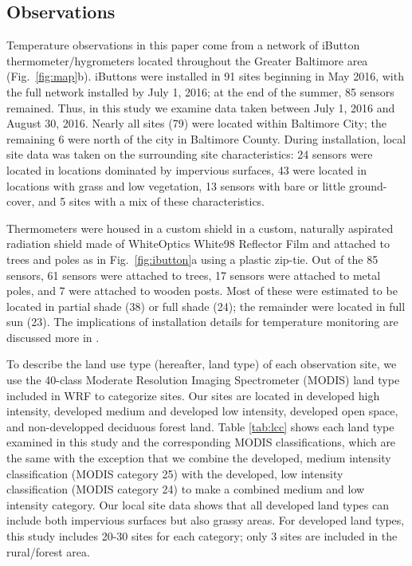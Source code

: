 \documentclass[draft,linenumbers]{agujournal}
\begin{document}
\subsection{Observations}
Temperature observations in this paper come from a network of iButton thermometer/hygrometers located throughout the Greater Baltimore area (Fig.~\ref{fig:map}b). 
iButtons were installed in 91 sites beginning in May 2016, with the full network installed by July 1, 2016; at the end of the summer, 85 sensors remained. Thus, in this study we examine data taken between July 1, 2016 and August 30, 2016. Nearly all sites (79) were located within Baltimore City; the remaining 6 were north of the city in Baltimore County. During installation, local site data was taken on the surrounding site characteristics: 24 sensors were located in locations dominated by impervious surfaces, 43 were located in locations with grass and low vegetation, 13 sensors with bare or little ground-cover, and 5 sites with a mix of these characteristics. 

Thermometers were housed in a custom shield in a custom, naturally aspirated radiation shield made of WhiteOptics White98 Reflector Film and attached to trees and poles as in Fig.~\ref{fig:ibutton}a using a plastic zip-tie. Out of the 85 sensors, 61 sensors were attached to trees, 17 sensors were attached to metal poles, and 7 were attached to wooden posts. Most of these were estimated to be located in partial shade (38) or full shade (24); the remainder were located in full sun (23). The implications of installation details for temperature monitoring are discussed more in \cite{scott2017intraurban}.

 To describe the land use type (hereafter, land type) of each observation site, we use the 40-class Moderate Resolution Imaging Spectrometer (MODIS) land type included in WRF to categorize sites. Our sites are located in developed high intensity, developed medium and developed low intensity, developed open space, and non-developped deciduous forest land.
 Table \ref{tab:lcc} shows each land type examined in this study and the corresponding MODIS classifications, which are the same with the exception that we combine the developed, medium intensity classification (MODIS category 25) with the developed, low intensity classification (MODIS category 24) to make a combined medium and low intensity category. Our local site data shows that all developed land types can include both impervious surfaces but also grassy areas. 
For developed land types, this study includes 20-30 sites for each category; only 3 sites are included in the rural/forest area. 
\end{document}
